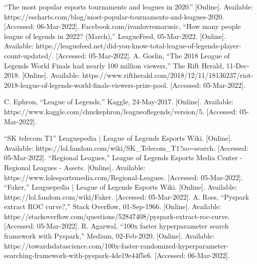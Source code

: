 \documentclass[conference]{IEEEtran}
\begin{document}
\begin{thebibliography}{00}


 “The most popular esports tournaments and leagues in 2020.” [Online]. Available: https://escharts.com/blog/most-popular-tournaments-and-leagues-2020. [Accessed: 06-Mar-2022]. 
 Facebook.com/ivanlovremarusic, “How many people league of legends in 2022? (March),” LeagueFeed, 05-Mar-2022. [Online]. Available: https://leaguefeed.net/did-you-know-total-league-of-legends-player-count-updated/. [Accessed: 05-Mar-2022]. 
 A. Goslin, “The 2018 League of Legends World Finals had nearly 100 million viewers,” The Rift Herald, 11-Dec-2018. [Online]. Available: https://www.riftherald.com/2018/12/11/18136237/riot-2018-league-of-legends-world-finals-viewers-prize-pool. [Accessed: 05-Mar-2022]. 

C. Ephron, “League of Legends,” Kaggle, 24-May-2017. [Online]. Available: https://www.kaggle.com/chuckephron/leagueoflegends/version/5. [Accessed: 05-Mar-2022]. 

 “SK telecom T1” Leaguepedia | League of Legends Esports Wiki. [Online]. Available: https://lol.fandom.com/wiki/SK\_Telecom\_T1?so=search. [Accessed: 05-Mar-2022]. 
 “Regional Leagues,” League of Legends Esports Media Center - Regional Leagues - Assets. [Online]. Available: https://www.lolesportsmedia.com/Regional-Leagues. [Accessed: 05-Mar-2022]. 
 “Faker,” Leaguepedia | League of Legends Esports Wiki. [Online]. Available: https://lol.fandom.com/wiki/Faker. [Accessed: 05-Mar-2022]. 
 A. Ross, “Pyspark extract ROC curve?,” Stack Overflow, 01-Sep-1966. [Online]. Available: https://stackoverflow.com/questions/52847408/pyspark-extract-roc-curve. [Accessed: 05-Mar-2022]. 
 R. Agarwal, “100x faster hyperparameter search framework with Pyspark,” Medium, 02-Feb-2020. [Online]. Available: https://towardsdatascience.com/100x-faster-randomized-hyperparameter-searching-framework-with-pyspark-4de19e44f5e6. [Accessed: 06-Mar-2022]. 

\end{thebibliography}
\end{document}
